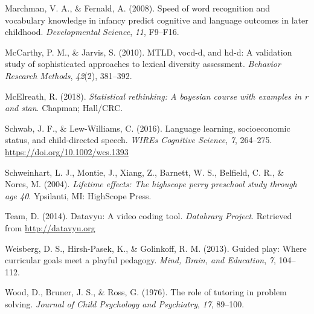 \documentclass[
  english,
  man]{apa6}
\begin{document}
\leavevmode\hypertarget{ref-Marchman2008}{}%
Marchman, V. A., \& Fernald, A. (2008). Speed of word recognition and vocabulary knowledge in infancy predict cognitive and language outcomes in later childhood. \emph{Developmental Science}, \emph{11}, F9--F16.

\leavevmode\hypertarget{ref-McCarthy2010}{}%
McCarthy, P. M., \& Jarvis, S. (2010). MTLD, vocd-d, and hd-d: A validation study of sophisticated approaches to lexical diversity assessment. \emph{Behavior Research Methods}, \emph{42}(2), 381--392.

\leavevmode\hypertarget{ref-McElreath2018}{}%
McElreath, R. (2018). \emph{Statistical rethinking: A bayesian course with examples in r and stan}. Chapman; Hall/CRC.

\leavevmode\hypertarget{ref-Schwab2016}{}%
Schwab, J. F., \& Lew-Williams, C. (2016). Language learning, socioeconomic status, and child-directed speech. \emph{WIREs Cognitive Science}, \emph{7}, 264--275. \url{https://doi.org/10.1002/wcs.1393}

\leavevmode\hypertarget{ref-PerryPreschool2004}{}%
Schweinhart, L. J., Montie, J., Xiang, Z., Barnett, W. S., Belfield, C. R., \& Nores, M. (2004). \emph{Lifetime effects: The highscope perry preschool study through age 40}. Ypsilanti, MI: HighScope Press.

\leavevmode\hypertarget{ref-datavyu}{}%
Team, D. (2014). Datavyu: A video coding tool. \emph{Databrary Project}. Retrieved from \url{http://datavyu.org}

\leavevmode\hypertarget{ref-Weisberg2013}{}%
Weisberg, D. S., Hirsh-Pasek, K., \& Golinkoff, R. M. (2013). Guided play: Where curricular goals meet a playful pedagogy. \emph{Mind, Brain, and Education}, \emph{7}, 104--112.

\leavevmode\hypertarget{ref-Wood1976}{}%
Wood, D., Bruner, J. S., \& Ross, G. (1976). The role of tutoring in problem solving. \emph{Journal of Child Psychology and Psychiatry}, \emph{17}, 89--100.

\endgroup
\end{document}
